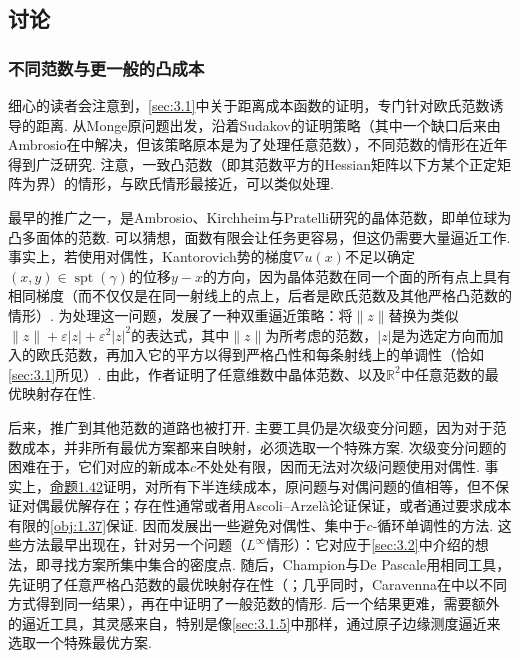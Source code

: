 \subsection{讨论}\label{sec:3.3}
\subsubsection{不同范数与更一般的凸成本}\label{sec:3.3.1}
细心的读者会注意到，\autoref{sec:3.1}中关于距离成本函数的证明，专门针对欧氏范数诱导的距离. 从Monge原问题出发，沿着Sudakov\cite{b290}的证明策略（其中一个缺口后来由Ambrosio在\cite{b8,b10}中解决，但该策略原本是为了处理任意范数），不同范数的情形在近年得到广泛研究. 注意，一致凸范数（即其范数平方的Hessian矩阵以下方某个正定矩阵为界）的情形，与欧氏情形最接近，可以类似处理.

最早的推广之一，是Ambrosio、Kirchheim与Pratelli研究的晶体范数\cite{b14}，即单位球为凸多面体的范数. 可以猜想，面数有限会让任务更容易，但这仍需要大量逼近工作. 事实上，若使用对偶性，Kantorovich势的梯度$\nabla u(x)$不足以确定$(x,y)\in\operatorname{spt}(\gamma)$的位移$y-x$的方向，因为晶体范数在同一个面的所有点上具有相同梯度（而不仅仅是在同一射线上的点上，后者是欧氏范数及其他严格凸范数的情形）. 为处理这一问题，\cite{b14}发展了一种双重逼近策略：将$\|z\|$替换为类似$\|z\|+\varepsilon|z|+\varepsilon^2|z|^2$的表达式，其中$\|z\|$为所考虑的范数，$|z|$是为选定方向而加入的欧氏范数，再加入它的平方以得到严格凸性和每条射线上的单调性（恰如\autoref{sec:3.1}所见）. 由此，作者证明了任意维数中晶体范数、以及$\mathbb R^2$中任意范数的最优映射存在性.

后来，推广到其他范数的道路也被打开. 主要工具仍是次级变分问题，因为对于范数成本，并非所有最优方案都来自映射，必须选取一个特殊方案. 次级变分问题的困难在于，它们对应的新成本$c$不处处有限，因而无法对次级问题使用对偶性. 事实上，\hyperref[obj:1.42]{命题1.42}证明，对所有下半连续成本，原问题与对偶问题的值相等，但不保证对偶最优解存在；存在性通常或者用Ascoli--Arzelà论证保证，或者通过要求成本有限的\autoref{obj:1.37}保证. 因而发展出一些避免对偶性、集中于$c$-循环单调性的方法. 这些方法最早出现在\cite{b122}，针对另一个问题（$L^\infty$情形）：它对应于\autoref{sec:3.2}中介绍的想法，即寻找方案所集中集合的密度点. \label{idx:i58-p110}
随后，Champion与De Pascale用相同工具，先证明了任意严格凸范数的最优映射存在性（\cite{b119}；几乎同时，Caravenna在\cite{b103}中以不同方式得到同一结果），再在\cite{b120}中证明了一般范数的情形. 后一个结果更难，需要额外的逼近工具，其灵感来自\cite{b273}，特别是像\autoref{sec:3.1.5}中那样，通过原子边缘测度逼近来选取一个特殊最优方案.

